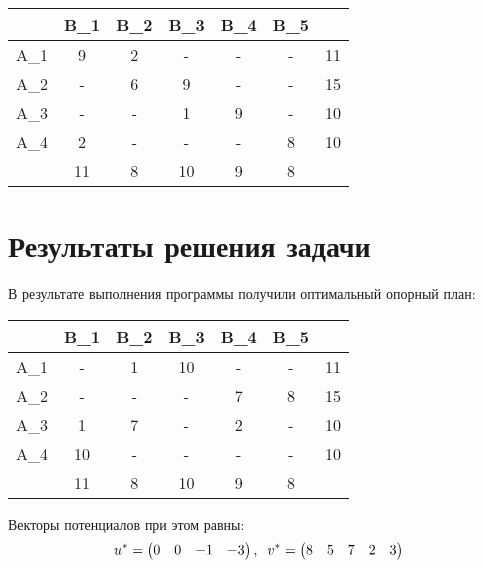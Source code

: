 \documentclass{article}
\begin{document}
\begin{table}[H]
    \centering
    \begin{tabular}{|c|c|c|c|c|c| |c|}
    \hline
        &\cellcolor{myGren} B_1 & \cellcolor{myGren}B_2 & \cellcolor{myGren}B_3 & \cellcolor{myGren}B_4 & \cellcolor{myGren} B_5 &  \\ \hline
       \cellcolor{myGren} A_1 & 9 & 2 &- & - & - & 11\\ \hline
       \cellcolor{myGren} A_2 & - & 6 & 9 & - & - & 15\\  \hline
       \cellcolor{myGren} A_3 & - & - & 1 & 9 & - & 10\\ \hline
       \cellcolor{myGren} A_4 & 2 & - & - & - & 8 & 10\\ \hline \hline
            & 11 &  8 & 10 & 9 & 8 & \\
        \hline
    \end{tabular}
    \label{tab:my_label}
\end{table}

\section{Результаты решения задачи}
\noindent В результате выполнения программы получили оптимальный опорный план: 
\begin{table}[H]
    \centering
    \begin{tabular}{|c|c|c|c|c|c| |c|}
    \hline
        &\cellcolor{myGren} B_1 & \cellcolor{myGren}B_2 & \cellcolor{myGren}B_3 & \cellcolor{myGren}B_4 & \cellcolor{myGren} B_5 &  \\ \hline
       \cellcolor{myGren} A_1 &  - & 1 & 10 & - & - & 11\\ \hline
       \cellcolor{myGren} A_2 & - & - & - & 7 & 8 & 15\\  \hline
       \cellcolor{myGren} A_3 & 1 & 7 & - & 2 & - & 10\\ \hline
       \cellcolor{myGren} A_4 & 10 & - & - & - & - & 10\\ \hline \hline
            & 11 &  8 & 10 & 9 & 8 & \\
        \hline
    \end{tabular}
    \label{tab:my_label}
\end{table}
\noindent Векторы потенциалов при этом равны: 
\begin{equation*}
u^*=
    \begin{pmatrix}
        0 &0 &-1 &-3
    \end{pmatrix}
,\;\;v^*=
    \begin{pmatrix}
        8 &5 &7 &2 &3
    \end{pmatrix}\\
\end{equation*}
\end{document}
